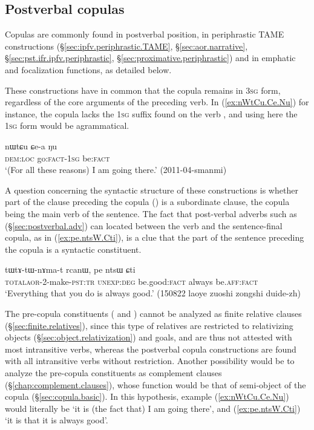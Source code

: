 
\subsection{Postverbal copulas}  \label{sec:postverbal.copulas}
Copulas are commonly found in postverbal position, in periphrastic TAME constructions (§\ref{sec:ipfv.periphrastic.TAME}, §\ref{sec:aor.narrative}, §\ref{sec:pst.ifr.ipfv.periphrastic}, §\ref{sec:proximative.periphrastic}) and in emphatic and focalization functions, as detailed below.

These constructions have in common that the copula remains in \textsc{3sg} form, regardless of the core arguments of the preceding verb. In (\ref{ex:nWtCu.Ce.Nu}) for instance, the copula  lacks the \textsc{1sg} suffix found on the verb , and using here the \textsc{1sg} form  would be agrammatical.


\begin{exe}
\ex \label{ex:nWtCu.Ce.Nu}
\gll nɯtɕu ɕe-a ŋu \\
\textsc{dem}:\textsc{loc} go:\textsc{fact}-\textsc{1sg} be:\textsc{fact} \\
\glt `(For all these reasons) I am going there.' (2011-04-smanmi)
\end{exe}

A question concerning the syntactic structure of these constructions is whether part of the clause preceding the copula () is a subordinate clause, the copula being the main verb of the sentence. The fact that post-verbal adverbs such as  (§\ref{sec:postverbal.adv}) can located between the verb and the sentence-final copula, as in (\ref{ex:pe.ntsW.Cti}), is a clue that the part of the sentence preceding the copula is a syntactic constituent.

\begin{exe}
\ex \label{ex:pe.ntsW.Cti}
\gll  tɯ\redp{}tɤ-tɯ-nɤma-t rcanɯ, pe ntsɯ ɕti\\
\textsc{total}\redp{}\textsc{aor}-2-make-\textsc{pst}:\textsc{tr} \textsc{unexp}:\textsc{deg} be.good:\textsc{fact} always be.\textsc{aff}:\textsc{fact}\\
\glt `Everything that you do is always good.' (150822 laoye zuoshi zongshi duide-zh)
\end{exe}

The pre-copula constituents ( and ) cannot be analyzed as finite relative clauses (§\ref{sec:finite.relatives}), since this type of relatives are restricted to relativizing objects (§\ref{sec:object.relativization}) and goals, and are thus not attested with most intransitive verbs, whereas the postverbal copula constructions are found with all intransitive verbs without restriction. Another possibility would be to analyze the pre-copula constituents as complement clauses (§\ref{chap:complement.clauses}), whose function would be that of semi-object of the copula (§\ref{sec:copula.basic}). In this hypothesis, example (\ref{ex:nWtCu.Ce.Nu}) would literally be `it is (the fact that) I am going there', and (\ref{ex:pe.ntsW.Cti}) `it is that it is always good'.

